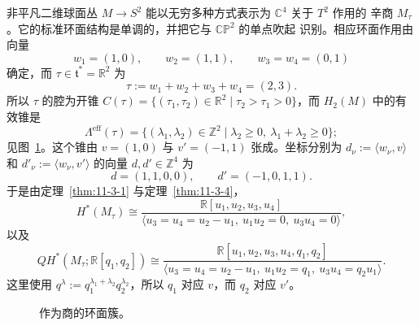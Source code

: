 \begin{example}\label{ex:11-3-12}
非平凡二维球面丛 $M\to S^2$ 能以无穷多种方式表示为 $\mathbb C^4$ 关于 $T^2$ 作用的
辛商 $M_\tau$。它的标准环面结构是单调的，并把它与 $\mathbb{CP}^2$ 的单点吹起
识别。相应环面作用由向量
\[
  w_1=(1,0),\qquad w_2=(1,1),\qquad w_3=w_4=(0,1)
\]
确定，而 $\tau\in\mathfrak t^*=\mathbb R^2$ 为
\[
  \tau:=w_1+w_2+w_3+w_4=(2,3).
\]
所以 $\tau$ 的腔为开锥
$C(\tau)=\{(\tau_1,\tau_2)\in\mathbb R^2\mid\tau_2>\tau_1>0\}$，而
$H_2(M)$ 中的有效锥是
\[
  \Lambda^{\mathrm{eff}}(\tau)
  =\{(\lambda_1,\lambda_2)\in\mathbb Z^2\mid
  \lambda_2\geq0,\ \lambda_1+\lambda_2\geq0\};
\]
见图~\ref{fig:11-3-1}。这个锥由 $v=(1,0)$ 与 $v'=(-1,1)$ 张成。坐标分别为
$d_\nu:=\langle w_\nu,v\rangle$ 和
$d'_\nu:=\langle w_\nu,v'\rangle$ 的向量 $d,d'\in\mathbb Z^4$ 为
\[
  d=(1,1,0,0),\qquad d'=(-1,0,1,1).
\]
于是由定理~\ref{thm:11-3-1} 与定理~\ref{thm:11-3-4}，
\[
  H^*(M_\tau)\cong
  \frac{\mathbb R[u_1,u_2,u_3,u_4]}
  {\langle u_3=u_4=u_2-u_1,\ u_1u_2=0,\ u_3u_4=0\rangle},
\]
以及
\[
  QH^*(M_\tau;\mathbb R[q_1,q_2])\cong
  \frac{\mathbb R[u_1,u_2,u_3,u_4,q_1,q_2]}
  {\langle u_3=u_4=u_2-u_1,\ u_1u_2=q_1,\ u_3u_4=q_2u_1\rangle}.
\]
这里使用
$q^\lambda:=q_1^{\lambda_1+\lambda_2}q_2^{\lambda_2}$，所以 $q_1$ 对应 $v$，而
$q_2$ 对应 $v'$。
\end{example}

\begin{figure}[tbp]
\centering
{}
\caption{作为商的环面簇。}\label{fig:11-3-1}
\end{figure}

